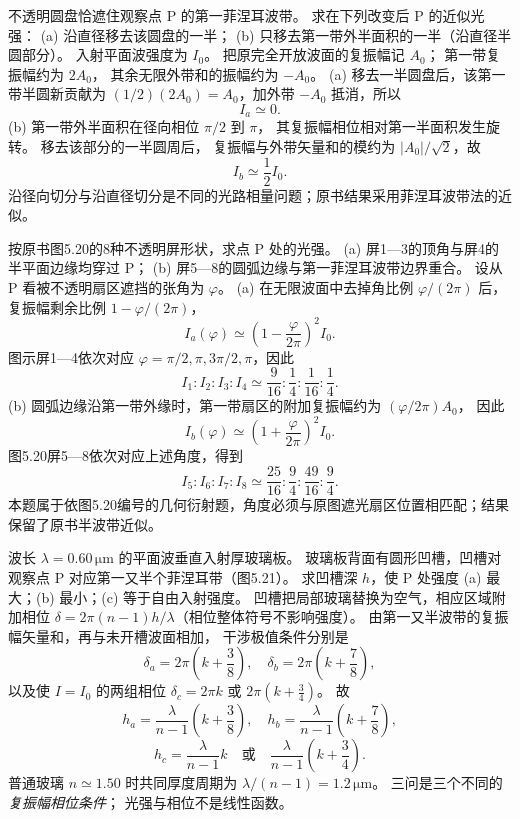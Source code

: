 不透明圆盘恰遮住观察点 P 的第一菲涅耳波带。
求在下列改变后 P 的近似光强：
(a) 沿直径移去该圆盘的一半；
(b) 只移去第一带外半面积的一半（沿直径半圆部分）。
入射平面波强度为 $I_0$。
\exsolution
把原完全开放波面的复振幅记 $A_0$；
第一带复振幅约为 $2A_0$，
其余无限外带和的振幅约为 $-A_0$。
(a) 移去一半圆盘后，该第一带半圆新贡献为
$(1/2)(2A_0)=A_0$，加外带 $-A_0$ 抵消，所以
\[
\boxed{I_a\simeq0}.
\]
(b) 第一带外半面积在径向相位 $\pi/2$ 到 $\pi$，
其复振幅相位相对第一半面积发生旋转。
移去该部分的一半圆周后，
复振幅与外带矢量和的模约为
$|A_0|/\sqrt2$，故
\[
\boxed{I_b\simeq\frac12I_0}.
\]
\excheck 沿径向切分与沿直径切分是不同的光路相量问题；原书结果采用菲涅耳波带法的近似。

按原书图5.20的8种不透明屏形状，求点 P 处的光强。
(a) 屏1—3的顶角与屏4的半平面边缘均穿过 P；
(b) 屏5—8的圆弧边缘与第一菲涅耳波带边界重合。
\exsolution
设从 P 看被不透明扇区遮挡的张角为 $\varphi$。
(a) 在无限波面中去掉角比例 $\varphi/(2\pi)$ 后，
复振幅剩余比例
$1-\varphi/(2\pi)$，
\[
\boxed{I_a(\varphi)\simeq
\left(1-\frac{\varphi}{2\pi}\right)^2I_0}.
\]
图示屏1—4依次对应
$\varphi=\pi/2,\pi,3\pi/2,\pi$，因此
\[
\boxed{I_1:I_2:I_3:I_4
\simeq\frac9{16}:\frac14:\frac1{16}:\frac14}.
\]
(b) 圆弧边缘沿第一带外缘时，第一带扇区的附加复振幅约为
$(\varphi/2\pi)A_0$，
因此
\[
\boxed{I_b(\varphi)\simeq
\left(1+\frac{\varphi}{2\pi}\right)^2I_0}.
\]
图5.20屏5—8依次对应上述角度，得到
\[
\boxed{I_5:I_6:I_7:I_8
\simeq\frac{25}{16}:\frac94:\frac{49}{16}:\frac94}.
\]
\excheck 本题属于依图5.20编号的几何衍射题，角度必须与原图遮光扇区位置相匹配；结果保留了原书半波带近似。

波长 $\lambda=0.60\,\mathrm{\mu m}$ 的平面波垂直入射厚玻璃板。
玻璃板背面有圆形凹槽，凹槽对观察点 P 对应第一又半个菲涅耳带（图5.21）。
求凹槽深 $h$，使 P 处强度
(a) 最大；(b) 最小；(c) 等于自由入射强度。
\exsolution
凹槽把局部玻璃替换为空气，相应区域附加相位
$\delta=2\pi(n-1)h/\lambda$（相位整体符号不影响强度）。
由第一又半波带的复振幅矢量和，再与未开槽波面相加，
干涉极值条件分别是
\[
\delta_a=2\pi\left(k+\frac38\right),\quad
\delta_b=2\pi\left(k+\frac78\right),
\]
以及使 $I=I_0$ 的两组相位
$\delta_c=2\pi k$ 或
$2\pi(k+\tfrac34)$。
故
\[
\boxed{h_a=\frac{\lambda}{n-1}
\left(k+\frac38\right)},\quad
\boxed{h_b=\frac{\lambda}{n-1}
\left(k+\frac78\right)},
\]
\[
\boxed{h_c=\frac{\lambda}{n-1}k
\quad\text{或}\quad
\frac{\lambda}{n-1}\left(k+\frac34\right)}.
\]
普通玻璃 $n\simeq1.50$ 时共同厚度周期为
$\lambda/(n-1)=1.2\,\mathrm{\mu m}$。
\excheck 三问是三个不同的\emph{复振幅相位条件}；
光强与相位不是线性函数。

